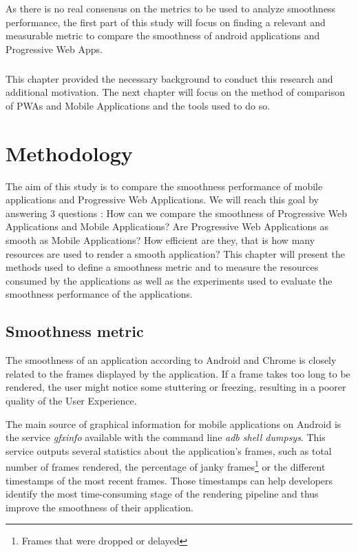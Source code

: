 \documentclass{kththesis}
\begin{document}
As there is no real consensus on the metrics to be used to analyze smoothness performance,  the first part of this study will focus on finding a relevant and measurable metric to compare the smoothness of android applications and Progressive Web Apps.

\paragraph{}
This chapter provided the necessary background to conduct this research and additional motivation. The next chapter will focus on the method of comparison of PWAs and Mobile Applications and the tools used to do so.
    

\chapter{Methodology}

The aim of this study is to compare the smoothness performance of mobile applications and Progressive Web Applications. We will reach this goal by answering 3 questions : How can we compare the smoothness of Progressive Web Applications and Mobile Applications? Are Progressive Web Applications as smooth as Mobile Applications? How efficient are they, that is how many resources are used to render a smooth application? \newline
This chapter will present the methods used to define a smoothness metric and to measure the resources consumed by the applications as well as the experiments used to evaluate the smoothness performance of the applications.


\section{Smoothness metric}
\label{method:smoothness}
    
    The smoothness of an application according to Android and Chrome is closely related to the frames displayed by the application. If a frame takes too long to be rendered, the user might notice some stuttering or freezing, resulting in a poorer quality of the User Experience. 
        
    The main source of graphical information for mobile applications on Android is the service \textit{gfxinfo} available with the command line \textit{adb shell dumpsys}. This service outputs several statistics about the application's frames, such as total number of frames rendered, the percentage of janky frames\footnote{Frames that were dropped or delayed} or the different timestamps of the most recent frames. Those timestamps can help developers identify the most time-consuming stage of the rendering pipeline and thus improve the smoothness of their application.
    
\end{document}
